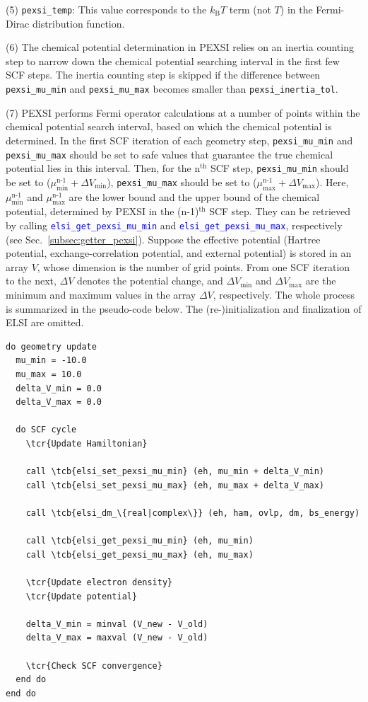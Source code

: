 \documentclass{report}
\newcommand{\tcb}[1]{\textcolor{blue}{#1}}
\newcommand{\tcr}[1]{\textcolor{red}{#1}}
\newcommand{\api}[1]{\textcolor{blue}{\texttt{#1}}}
\begin{document}
(5) \texttt{pexsi\_temp}: This value corresponds to the $k_\text{B} T$ term (not $T$) in the Fermi-Dirac distribution function.

(6) The chemical potential determination in PEXSI relies on an inertia counting step to narrow down the chemical potential searching interval in the first few SCF steps. The inertia counting step is skipped if the difference between \texttt{pexsi\_mu\_min} and \texttt{pexsi\_mu\_max} becomes smaller than \texttt{pexsi\_inertia\_tol}.

(7) PEXSI performs Fermi operator calculations at a number of points within the chemical potential search interval, based on which the chemical potential is determined. In the first SCF iteration of each geometry step, \texttt{pexsi\_mu\_min} and \texttt{pexsi\_mu\_max} should be set to safe values that guarantee the true chemical potential lies in this interval. Then, for the n$^\text{th}$ SCF step, \texttt{pexsi\_mu\_min} should be set to ($\mu_\text{min}^\text{n-1} + \Delta V_\text{min}$), \texttt{pexsi\_mu\_max} should be set to ($\mu_\text{max}^\text{n-1} + \Delta V_\text{max}$). Here, $\mu_\text{min}^\text{n-1}$ and $\mu_\text{max}^\text{n-1}$ are the lower bound and the upper bound of the chemical potential, determined by PEXSI in the (n-1)$^\text{th}$ SCF step. They can be retrieved by calling \api{elsi\_get\_pexsi\_mu\_min} and \api{elsi\_get\_pexsi\_mu\_max}, respectively (see Sec.~\ref{subsec:getter_pexsi}). Suppose the effective potential (Hartree potential, exchange-correlation potential, and external potential) is stored in an array $V$, whose dimension is the number of grid points. From one SCF iteration to the next, $\Delta V$ denotes the potential change, and $\Delta V_\text{min}$ and $\Delta V_\text{max}$ are the minimum and maximum values in the array $\Delta V$, respectively. The whole process is summarized in the pseudo-code below. The (re-)initialization and finalization of ELSI are omitted.

\begin{tcolorbox}
\begin{Verbatim}[commandchars=\\\{\}]
do geometry update
  mu_min = -10.0
  mu_max = 10.0
  delta_V_min = 0.0
  delta_V_max = 0.0

  do SCF cycle
    \tcr{Update Hamiltonian}

    call \tcb{elsi_set_pexsi_mu_min} (eh, mu_min + delta_V_min)
    call \tcb{elsi_set_pexsi_mu_max} (eh, mu_max + delta_V_max)

    call \tcb{elsi_dm_\{real|complex\}} (eh, ham, ovlp, dm, bs_energy)

    call \tcb{elsi_get_pexsi_mu_min} (eh, mu_min)
    call \tcb{elsi_get_pexsi_mu_max} (eh, mu_max)

    \tcr{Update electron density}
    \tcr{Update potential}

    delta_V_min = minval (V_new - V_old)
    delta_V_max = maxval (V_new - V_old)

    \tcr{Check SCF convergence}
  end do
end do
\end{Verbatim}
\end{tcolorbox}
\end{document}
